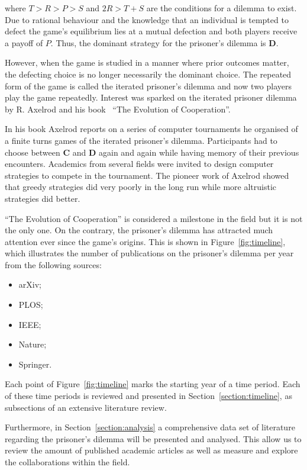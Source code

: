 \documentclass{article}
\theoremstyle{definition}
\begin{document}
where \(T > R > P > S \) and \(2R > T + S\) are the conditions for a dilemma
to exist. Due to rational behaviour and the knowledge that an individual is tempted
to defect the game's equilibrium lies at a mutual defection and both players
receive a payoff of \(P\). Thus, the dominant strategy for the prisoner's dilemma
is \textbf{D}.

However, when the game is studied in a manner where prior outcomes matter, the
defecting choice is no longer necessarily the dominant choice. The repeated
form of the game is called the iterated prisoner's dilemma and now two players play
the game repeatedly. Interest was sparked on the iterated prisoner dilemma by
R. Axelrod and his book~\cite{Axelrod1984} ``The Evolution of Cooperation''.

In his book Axelrod reports on a series of computer tournaments he organised of
a finite turns games of the iterated prisoner's dilemma. Participants
had to choose between \textbf{C} and \textbf{D} again and again while having
memory of their previous encounters. Academics from several fields were invited to
design computer strategies to compete in the tournament. The pioneer work of Axelrod
showed that greedy strategies did very poorly in the long run while more altruistic
strategies did better.

``The Evolution of Cooperation'' is considered a milestone in the field but it
is not the only one. On the contrary, the prisoner's dilemma has attracted much
attention ever since the game's origins. This is shown in Figure~\ref{fig:timeline},
which illustrates the number of  publications on the prisoner's dilemma per year
from the following sources:

\begin{multicols}{3}
    \begin{itemize}
        \item arXiv;
        \item PLOS;
        \item IEEE;
        \item Nature;
        \item Springer.
    \end{itemize}
\end{multicols}

Each point of Figure~\ref{fig:timeline} marks the starting year of a time period.
Each of these time periods is reviewed and presented in Section~\ref{section:timeline},
as subsections of an extensive literature review.

Furthermore, in Section~\ref{section:analysis} a comprehensive data set of literature
regarding the prisoner's dilemma will be presented and analysed. This allow us to
review the amount of published academic articles as well as measure and explore
the collaborations within the field.
\end{document}
